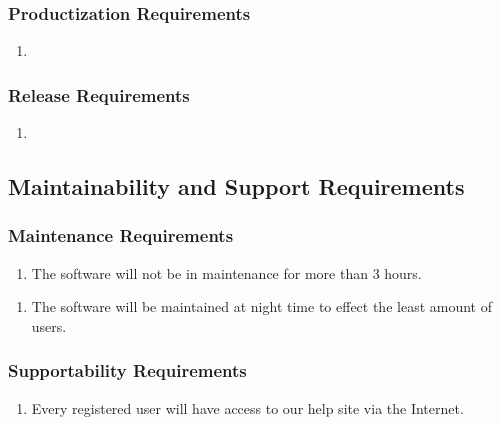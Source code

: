 \documentclass[]{article}
\begin{document}
\subsubsection{Productization Requirements}
\label{ssub:productization_requirements}
\begin{enumerate}[{OE}1. ]
	\item
\end{enumerate}

\subsubsection{Release Requirements}
\label{ssub:release_requirements}
\begin{enumerate}[{OE}1. ]
	\item
\end{enumerate}


\subsection{Maintainability and Support Requirements}
\label{sub:maintainability_and_support_requirements}

\subsubsection{Maintenance Requirements}
\label{ssub:maintenance_requirements}
\begin{enumerate}[{MS}1. ]
	\item The software will not be in maintenance for more than 3 hours.
\end{enumerate}
\begin{enumerate}[{MS}2. ]
	\item The software will be maintained at night time to effect the least amount of users.
\end{enumerate}

\subsubsection{Supportability Requirements}
\label{ssub:supportability_requirements}
\begin{enumerate}[{MS}1. ]
	\item Every registered user will have access to our help site via the Internet.
\end{enumerate}
\end{document}
